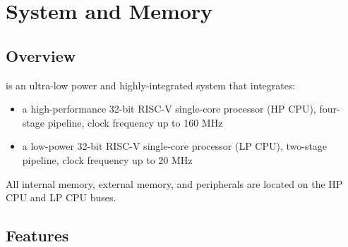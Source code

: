 \documentclass[main\_\_EN.tex]{subfiles}
\begin{document}

\ifglobal
\else
    {\let\clearpage\relax \listoftodos}
    {\let\clearpage\relax \listofdonetodos}
    \tableofcontents
\fi



\hypertarget{sysmem}{}
\chapter{System and Memory}
\label{mod:sysmem}

\section{Overview}

\chipname{} is an ultra-low power and highly-integrated system that integrates:
\begin{itemize}
    \item a high-performance 32-bit RISC-V single-core processor (HP CPU), four-stage pipeline, clock frequency up to 160 MHz
    \item a low-power 32-bit RISC-V single-core processor (LP CPU), two-stage pipeline, clock frequency up to 20 MHz
\end{itemize}

All internal memory, external memory, and peripherals are located on the HP CPU and LP CPU buses.


\section{Features}
\end{document}

